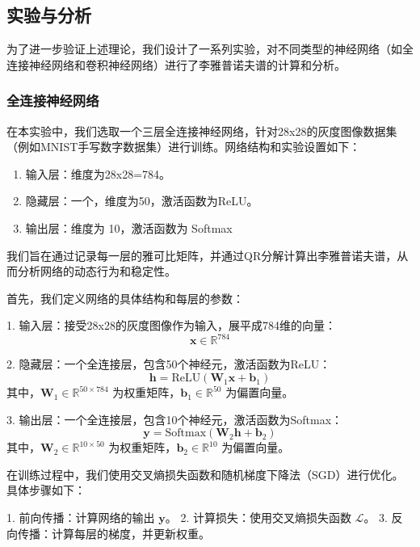 \documentclass[12pt,a4paper]{amsart}
\begin{document}
\subsection{实验与分析}

为了进一步验证上述理论，我们设计了一系列实验，对不同类型的神经网络（如全连接神经网络和卷积神经网络）进行了李雅普诺夫谱的计算和分析。

\subsubsection{全连接神经网络}

在本实验中，我们选取一个三层全连接神经网络，针对28x28的灰度图像数据集（例如MNIST手写数字数据集）进行训练。网络结构和实验设置如下：

\begin{enumerate}

  \item 输入层：维度为28x28=784。

  \item 隐藏层：一个，维度为50，激活函数为ReLU。

  \item 输出层：维度为 10，激活函数为 Softmax

\end{enumerate}

我们旨在通过记录每一层的雅可比矩阵，并通过QR分解计算出李雅普诺夫谱，从而分析网络的动态行为和稳定性。

首先，我们定义网络的具体结构和每层的参数：

1. 输入层：接受28x28的灰度图像作为输入，展平成784维的向量：
   \[
   \mathbf{x} \in \mathbb{R}^{784}
   \]

2. 隐藏层：一个全连接层，包含50个神经元，激活函数为ReLU：
   \[
   \mathbf{h} = \text{ReLU}(\mathbf{W}_1 \mathbf{x} + \mathbf{b}_1)
   \]
   其中，\(\mathbf{W}_1 \in \mathbb{R}^{50 \times 784}\) 为权重矩阵，\(\mathbf{b}_1 \in \mathbb{R}^{50}\) 为偏置向量。

3. 输出层：一个全连接层，包含10个神经元，激活函数为Softmax：
   \[
   \mathbf{y} = \text{Softmax}(\mathbf{W}_2 \mathbf{h} + \mathbf{b}_2)
   \]
   其中，\(\mathbf{W}_2 \in \mathbb{R}^{10 \times 50}\) 为权重矩阵，\(\mathbf{b}_2 \in \mathbb{R}^{10}\) 为偏置向量。

在训练过程中，我们使用交叉熵损失函数和随机梯度下降法（SGD）进行优化。具体步骤如下：

1. 前向传播：计算网络的输出 \(\mathbf{y}\)。
2. 计算损失：使用交叉熵损失函数 \(\mathcal{L}\)。
3. 反向传播：计算每层的梯度，并更新权重。
\end{document}
